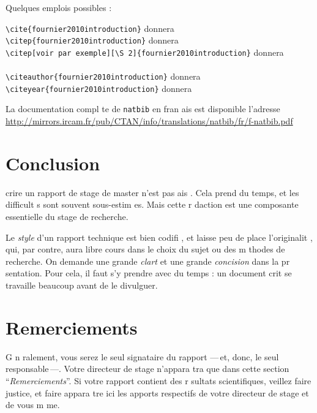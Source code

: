 \documentclass{article}
\begin{document}
 Quelques emplois possibles :

 \verb"\cite{fournier2010introduction}"  donnera \cite{fournier2010introduction}  \\
 \verb"\citep{fournier2010introduction}" donnera \citep{fournier2010introduction}  \\
 \verb"\citep[voir par exemple][\S 2]{fournier2010introduction}"  donnera \\
 \hspace*{1cm}\citep[voir par exemple][\S 2]{fournier2010introduction}  \\
 \verb"\citeauthor{fournier2010introduction}"  donnera \citeauthor{fournier2010introduction}  \\
 \verb"\citeyear{fournier2010introduction}"  donnera \citeyear{fournier2010introduction}  

 La documentation compl te de \texttt{natbib} en fran ais est disponible   l'adresse \\
\href{http://mirrors.ircam.fr/pub/CTAN/info/translations/natbib/fr/f-natbib.pdf}
{http://mirrors.ircam.fr/pub/CTAN/info/translations/natbib/fr/f-natbib.pdf}

\section{Conclusion}

 crire un rapport de stage de master n'est pas ais . 
Cela prend du temps, et les difficult s sont souvent sous-estim es.
Mais cette r daction est une composante essentielle du stage de recherche.

Le \emph{style\/} d'un rapport technique est bien codifi , et laisse peu de place
  l'originalit , qui, par contre, aura libre cours dans le choix du sujet
ou des m thodes de recherche. On demande une grande \emph{ clart \/} et une grande 
\emph{concision\/} dans la pr sentation. 
Pour cela, il faut s'y prendre avec du temps : un document  crit se travaille 
beaucoup avant de le divulguer.

\section{Remerciements}

G n ralement, vous serez le seul signataire du rapport ---\,et, donc, le seul 
responsable\,---.
Votre directeur de stage n'appara tra que dans cette section 
``\emph{Remerciements\/}''. 
Si votre rapport contient des r sultats scientifiques, veillez   faire justice, 
et faire appara tre ici les apports respectifs de votre directeur de stage
et de vous m me.
\end{document}
